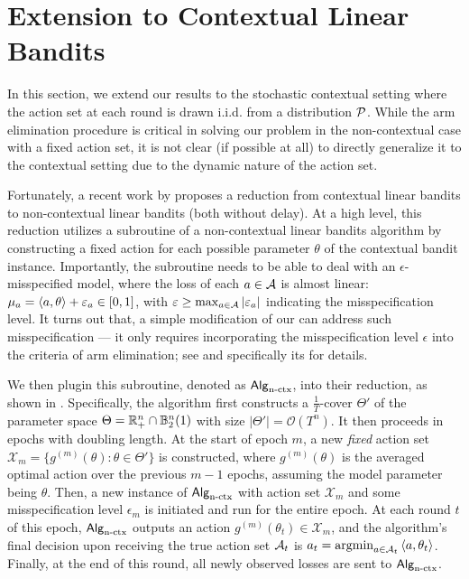 

\section{Extension to Contextual Linear Bandits}\label{sec: contextual}


In this section, we extend our results to the stochastic contextual setting where the action set at each round is drawn i.i.d. from a distribution ${\mathcal{P}}$. 
While the arm elimination procedure is critical in solving our problem in the non-contextual case with a fixed action set, it is not clear (if possible at all) to directly generalize it to the contextual setting due to the dynamic nature of the action set.


Fortunately, a recent work by \citet{hanna2023contexts} proposes a reduction from contextual linear bandits to non-contextual linear bandits (both without delay).
At a high level, this reduction utilizes a subroutine of a non-contextual linear bandits algorithm by constructing a fixed action for each possible parameter $\theta$ of the contextual bandit instance. 
Importantly, the subroutine needs to be able to deal with an $\epsilon$-misspecified model, where the loss of each $a\in {\mathcal{A}}$ is almost linear: $\mu_a=\left\langle {a,\theta} \right\rangle+\varepsilon_a\in [0,1]$, with $\varepsilon \geq \max_{a\in{\mathcal{A}}}|\varepsilon_a|$ indicating the misspecification level. 
It turns out that, a simple modification of our  can address such misspecification --- it only requires incorporating the misspecification level $\epsilon$ into the criteria of arm elimination;
see  and specifically its  for details.


We then plugin this subroutine, denoted as ${\mathsf{Alg}}_{\text{n-ctx}}$, into their reduction, as shown in .
Specifically, the algorithm first constructs a $\frac{1}{T}$-cover $\Theta'$ of the parameter space $\Theta=\mathbb{R}_+^n\cap\mathbb{B}_2^n(1)$ with size $|\Theta'| = \mathcal{O}(T^n)$. 
It then proceeds in epochs with doubling length. 
At the start of epoch $m$, 
a new \emph{fixed} action set $\mathcal{X}_m = \{g^{(m)}(\theta) : \theta \in \Theta'\}$ is constructed, where $g^{(m)}(\theta)$ is the averaged optimal action over the previous $m-1$ epochs, assuming the model parameter being $\theta$.
Then, a new instance of ${\mathsf{Alg}}_{\text{n-ctx}}$ with action set $\mathcal{X}_m$ and some 
misspecification level $\epsilon_m$ is initiated and run for the entire epoch.
At each round $t$ of this epoch, ${\mathsf{Alg}}_{\text{n-ctx}}$ outputs an action $g^{(m)}(\theta_t) \in \mathcal{X}_m$, and the algorithm's final decision upon receiving the true action set ${\mathcal{A}}_t$ is $a_t=\operatorname*{argmin}_{a\in {\mathcal{A}}_t}\left\langle {a,\theta_t} \right\rangle$.
Finally, at the end of this round, all newly observed losses are sent to ${\mathsf{Alg}}_{\text{n-ctx}}$.



